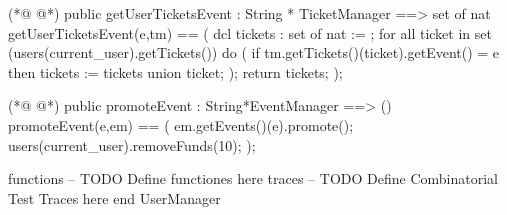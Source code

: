 \begin{vdmpp}[breaklines=true]
(*@
\label{getUserTicketsEvent:71}
@*)
 public getUserTicketsEvent : String * TicketManager ==> set of nat
 getUserTicketsEvent(e,tm) == (
  dcl tickets : set of nat := {};
  for all ticket in set (users(current_user).getTickets()) do 
  (
   if tm.getTickets()(ticket).getEvent() = e
    then tickets := tickets union {ticket};
  );
  return tickets;
 );
 
(*@
\label{promoteEvent:82}
@*)
 public promoteEvent : String*EventManager ==> ()
 promoteEvent(e,em) == (
  em.getEvents()(e).promote();
  users(current_user).removeFunds(10);
 );
 
 
 
functions
-- TODO Define functiones here
traces
-- TODO Define Combinatorial Test Traces here
end UserManager
\end{vdmpp}
